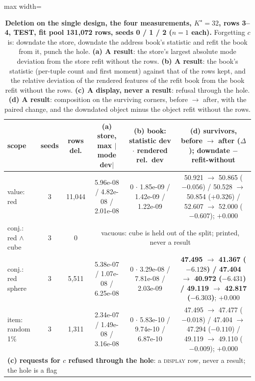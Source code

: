 \documentclass{article} %
\newcommand{\Kstar}{\ensuremath{K^{\star}}}
\begin{document}
\begin{table}[t]
\centering\small
\caption{\textbf{Deletion on the single design, the four measurements, $\Kstar=32$, rows 3--4, TEST, fit %
pool 131,072 rows, seeds 0 / 1 / 2 ($n=1$ each).} Forgetting $c$ is: downdate the store, downdate %
the address book's statistic and refit the book from it, punch the hole. \textbf{(a) A result}: the
store's largest absolute mode deviation from the store refit without the rows. \textbf{(b) A
result}: the book's statistic (per-tuple count and first moment) against that of the rows kept, and
the relative deviation of the rendered features of the refit book from the book refit without the
rows. \textbf{(c) A display, never a result}: refusal through the hole. \textbf{(d) A result}:
composition on the surviving corners, before $\to$ after, with the paired change, and the downdated
object minus the object refit without the rows.}
\label{tab:del}
\setlength{\tabcolsep}{2.4pt}
\begin{adjustbox}{max width=\linewidth}\begin{tabular}{lccccc}
\toprule
scope & seeds & rows del. & (a) store, max $|$mode dev$|$ & (b) book: statistic dev $\cdot$ rendered rel.\ dev & (d) survivors, before $\to$ after ($\Delta$); downdate $-$ refit-without \\
\midrule
value: red & 3 & 11,044 & 5.96e-08 / 4.82e-08 / 2.01e-08 & 0 $\cdot$ 1.85e-09 / 1.42e-09 / 1.22e-09 & 50.921 $\to$ 50.865 ($-0.056$) / 50.528 $\to$ 50.854 ($+0.326$) / 52.607 $\to$ 52.000 ($-0.607$); $+0.000$ \\
conj.: red $\wedge$ cube & 3 & 0 & \multicolumn{3}{c}{vacuous: cube is held out of the split; printed, never a result} \\
conj.: red sphere & 3 & 5,511 & 5.38e-07 / 1.07e-08 / 6.25e-08 & 0 $\cdot$ 3.29e-08 / 7.81e-08 / 2.03e-09 & \textbf{47.495 $\to$ 41.367 ($-6.128$) / 47.404 $\to$ 40.972 ($-6.431$) / 49.119 $\to$ 42.817 ($-6.303$)}; $+0.000$ \\
item: random 1\% & 3 & 1,311 & 2.34e-07 / 1.49e-08 / 3.16e-08 & 0 $\cdot$ 5.83e-10 / 9.74e-10 / 6.87e-10 & 47.495 $\to$ 47.477 ($-0.018$) / 47.404 $\to$ 47.294 ($-0.110$) / 49.119 $\to$ 49.110 ($-0.009$); $+0.000$ \\
\midrule
\multicolumn{6}{l}{\textbf{(c) requests for $c$ refused through the hole}: a \textsc{display} row, never a result; the hole is a flag} \\

\end{tabular}
\end{adjustbox}
\end{table}
\end{document}
